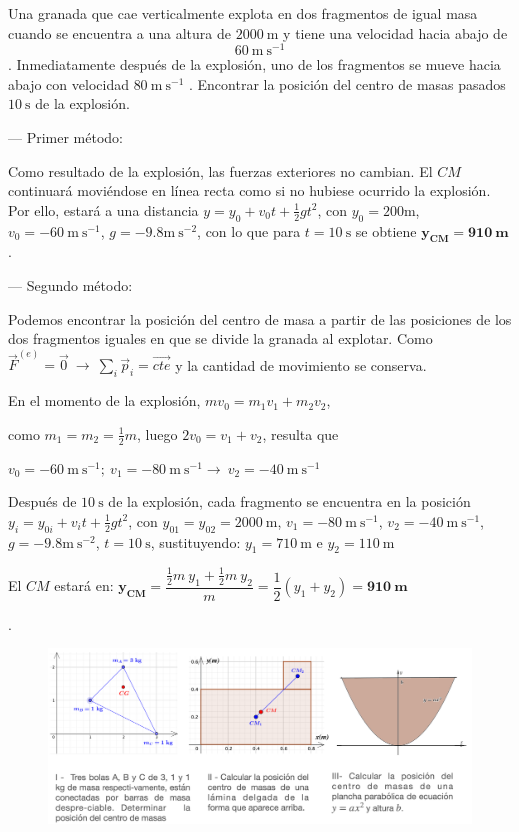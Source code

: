 \begin{prob}
Una granada que cae verticalmente explota en dos fragmentos de igual masa cuando se encuentra a una altura de $2000 \ \mathrm{m}$ y tiene una velocidad hacia abajo de $$60\ \mathrm{m \ s}^{-1}$$. Inmediatamente después de la explosión, uno de los fragmentos se mueve hacia abajo con velocidad $80\ \mathrm{m \ s}^{-1}$	. Encontrar la posición del centro de masas pasados $10\ \mathrm{s}$ de la explosión.
\end{prob}

--- Primer método:

Como resultado de la explosión, las fuerzas exteriores no cambian. El $CM$ continuará moviéndose en línea recta como si no hubiese ocurrido la explosión. Por ello, estará a una distancia $y=y_0+v_0t+\frac 1 2 g t^2$, con $y_0=200\mathrm{m}$, $v_0=-60\ \mathrm{m \ s}^{-1}$, $g=-9.8  \mathrm{m \ s}^{-2}$, con lo que para $t=10\ \text{s}$ se obtiene $\boldsymbol{y_{CM}=910\ \text{m}}$.

--- Segundo método:

Podemos encontrar la posición del centro de masa a partir de las posiciones de los dos fragmentos iguales en que se divide la granada al explotar. Como $\vec F^{(e)}=\vec 0 \ \to \ \displaystyle \sum_i \vec p_i=\overrightarrow{cte}$ y la cantidad de movimiento se conserva.

En el momento de la explosión, $mv_0=m_1v_1+m_2v_2$, 

como $m_1=m_2=\frac 1 2 m$, luego $2v_0=v_1+v_2$, resulta que

$v_0=-60\ \mathrm{m \ s}^{-1};\ v_1=-80\ \mathrm{m \ s}^{-1} \to \ v_2=-40\ \mathrm{m \ s}^{-1}$

Después de $10 \ \text{s}$ de la explosión, cada fragmento se encuentra en la posición $y_i=y_{0i}+v_it+\frac 1 2 g t^2$, con $y_{01}=y_{02}=2000\ \text{m}$, $v_1=-80\ \mathrm{m \ s}^{-1}$, $v_2=-40\ \mathrm{m \ s}^{-1}$, $g=-9.8  \mathrm{m \ s}^{-2}$, $t=10\ \text{s}$, sustituyendo: $y_1=710\ \text{m}$ e $y_2=110\ \text{m}$

El $CM$ estará en: $\boldsymbol{y_{CM}}=\dfrac{\frac 1 2 m \ y_1 + \frac 1 2 m \ y_2}{m}= \dfrac 1 2 (y_1+y_2)=\boldsymbol{910\ \text{m}}$


\begin{prob}.
	\begin{figure}[H]
	\centering
	\includegraphics[width=1\textwidth]{imagenes/imagenes12/T12IM06.png}
\end{figure}
\end{prob}

